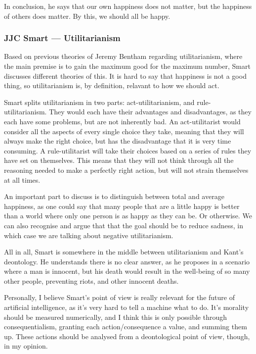 \documentclass{article}
\begin{document}
		In conclusion, he says that our own happiness does not matter, but the happiness of others does matter. By this, we should all be happy. 

	\subsubsection*{JJC Smart --- Utilitarianism}
	Based on previous theories of Jeremy Bentham regarding utilitarianism, where the main premise is to gain the maximum good for the maximum number, Smart discusses different theories of this. It is hard to say that happiness is not a good thing, so utilitarianism is, by definition, relavant to how we should act. 

	Smart splits utilitarianism in two parts: act-utilitarianism, and rule-utilitarianism. They would each have their advantages and disadvantages, as they each have some problems, but are not inherently bad. An act-utilitarist would consider all the aspects of every single choice they take, meaning that they will always make the right choice, but has the disadvantage that it is very time consuming. A rule-utilitarist will take their choices based on a series of rules they have set on themselves. This means that they will not think through all the reasoning needed to make a perfectly right action, but will not strain themselves at all times.

	An important part to discuss is to distinguish between total and average happiness, as one could say that many people that are a little happy is better than a world where only one person is as happy as they can be. Or otherwise. We can also recognise and argue that that the goal should be to reduce sadness, in which case we are talking about negative utilitarianism.

	All in all, Smart is somewhere in the middle between utilitarianism and Kant's deontology. He understands there is no clear answer, as he proposes in a scenario where a man is innocent, but his death would result in the well-being of so many other people, preventing riots, and other innocent deaths.

	Personally, I believe Smart's point of view is really relevant for the future of artificial intelligence, as it's very hard to tell a machine what to do. It's morality should be measured numerically, and I think this is only possible through consequentialism, granting each action/consequence a value, and summing them up. These actions should be analysed from a deontological point of view, though, in my opinion.
\end{document}
